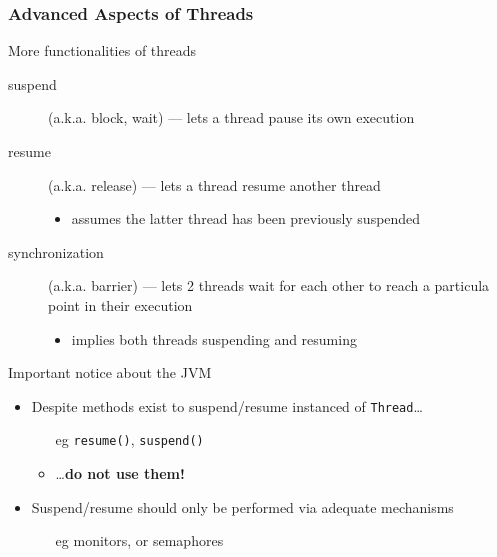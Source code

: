 \documentclass[presentation]{beamer}\mode<presentation>{\usetheme{AMSBolognaFC}}
\begin{document}
\begin{frame}[allowframebreaks]
    \frametitle{Advanced Aspects of Threads}



    \begin{exampleblock}{More functionalities of threads}
        \begin{description}
            \item[suspend] (a.k.a. block, wait)  --- lets a thread pause its own execution

            \item[resume] (a.k.a. release) --- lets a thread resume another thread
            \begin{itemize}
                \item assumes the latter thread has been previously suspended
            \end{itemize}

            \item[synchronization] (a.k.a. barrier) --- lets 2 threads wait for each other to reach a particula point in their execution
            \begin{itemize}
                \item implies both threads suspending and resuming
            \end{itemize}
        \end{description}
    \end{exampleblock}

    \begin{alertblock}{Important notice about the JVM}
        \begin{itemize}
            \item Despite methods exist to suspend/resume instanced of \texttt{Thread}\ldots
            \begin{itemize}
                \item[eg] \texttt{resume()}, \texttt{suspend()}
                \item \ldots \textbf{do not use them!}
            \end{itemize}

            \item Suspend/resume should only be performed via adequate mechanisms
            \begin{itemize}
                \item[eg] monitors, or semaphores
            \end{itemize}


\end{itemize}
\end{alertblock}
\end{frame}
\end{document}
